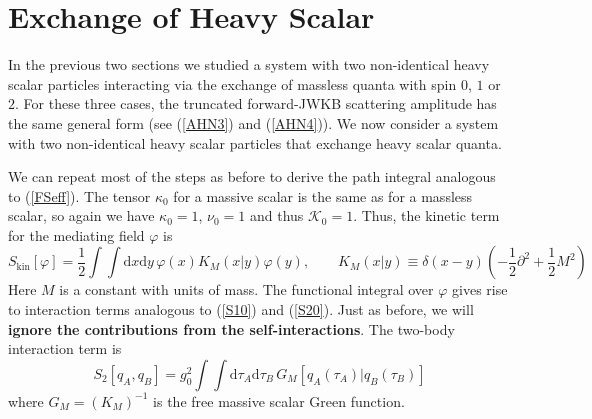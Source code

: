 \section{Exchange of Heavy Scalar\label{sec6}}
In the previous two sections we studied a system with two non-identical heavy scalar particles interacting via the exchange of massless quanta with spin $0$, $1$ or $2$. For these three cases, the truncated forward-JWKB scattering amplitude has the same general form (see (\ref{AHN3}) and (\ref{AHN4})). We now consider a system with two non-identical heavy scalar particles that exchange heavy scalar quanta.

We can repeat most of the steps as before to derive the path integral analogous to (\ref{FSeff}). The tensor $\kappa_{0}$ for a massive scalar is the same as for a massless scalar, so again we have $\kappa_{0} = 1$, $\nu_{0} = 1$ and thus $\mathcal{K}_{0} = 1$. Thus, the kinetic term for the mediating field $\varphi$ is
\begin{equation}
	S_{\text{kin}}[\varphi] = \frac{1}{2} \int \int \mathrm{d}x \mathrm{d}y \, \varphi(x) K_{M}(x|y) \varphi(y), \qquad K_{M}(x|y) \equiv \delta(x - y) \left(- \frac{1}{2} \partial^{2} + \frac{1}{2} M^{2} \right)
\end{equation}
Here $M$ is a constant with units of mass. The functional integral over $\varphi$ gives rise to interaction terms analogous to (\ref{S10}) and (\ref{S20}). Just as before, we will \textbf{ignore the contributions from the self-interactions}. The two-body interaction term is
\begin{equation}
	S_{2}[q_{A}, q_{B}] = g_{0}^{2} \int \int \mathrm{d}\tau_{A} \mathrm{d}\tau_{B} \, G_{M}[q_{A}(\tau_{A}) | q_{B}(\tau_{B})]
\end{equation}
where $G_{M} = (K_{M})^{-1}$ is the free massive scalar Green function.


